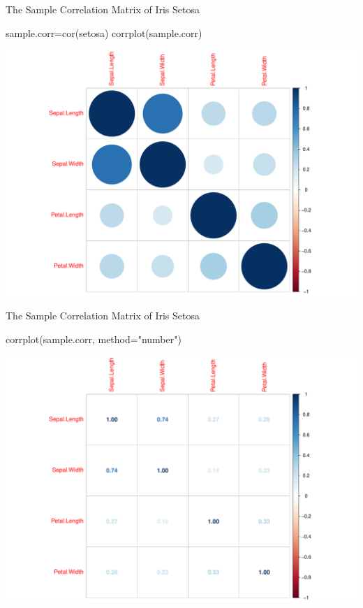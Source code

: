 \documentclass[
  ignorenonframetext,
]{beamer}
\newenvironment{Shaded}{\begin{snugshade}}{\end{snugshade}}
\newcommand{\AttributeTok}[1]{\textcolor[rgb]{0.77,0.63,0.00}{#1}}
\newcommand{\FunctionTok}[1]{\textcolor[rgb]{0.00,0.00,0.00}{#1}}
\newcommand{\NormalTok}[1]{#1}
\newcommand{\OtherTok}[1]{\textcolor[rgb]{0.56,0.35,0.01}{#1}}
\newcommand{\StringTok}[1]{\textcolor[rgb]{0.31,0.60,0.02}{#1}}
\begin{document}
\begin{frame}[fragile]{The Sample Correlation Matrix of Iris Setosa}
\protect\hypertarget{the-sample-correlation-matrix-of-iris-setosa}{}
\begin{Shaded}
\begin{Highlighting}[]
\NormalTok{sample.corr}\OtherTok{=}\FunctionTok{cor}\NormalTok{(setosa)}
\FunctionTok{corrplot}\NormalTok{(sample.corr)}
\end{Highlighting}
\end{Shaded}

\includegraphics[width=0.8\linewidth]{Lecture03_RandomV_files/figure-beamer/unnamed-chunk-5-1}
\end{frame}

\begin{frame}[fragile]{The Sample Correlation Matrix of Iris Setosa}
\protect\hypertarget{the-sample-correlation-matrix-of-iris-setosa-1}{}
\begin{Shaded}
\begin{Highlighting}[]
\FunctionTok{corrplot}\NormalTok{(sample.corr, }\AttributeTok{method=}\StringTok{"number"}\NormalTok{)}
\end{Highlighting}
\end{Shaded}

\includegraphics[width=0.8\linewidth]{Lecture03_RandomV_files/figure-beamer/unnamed-chunk-6-1}
\end{frame}
\end{document}
